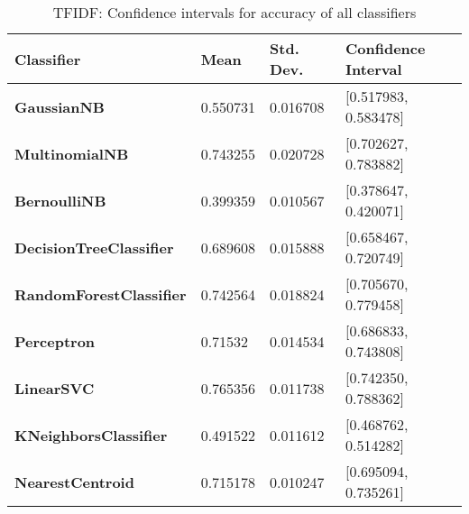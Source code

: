\documentclass{article}
\begin{document}
\begin{table}[H]
\begin{tabular}{l|lll}
\textbf{Classifier}             & \textbf{Mean} & \textbf{Std. Dev.} & \textbf{Confidence Interval} \\ \hline
\textbf{GaussianNB}             & 0.550731      & 0.016708                    & {[}0.517983, 0.583478{]}     \\
\textbf{MultinomialNB}          & 0.743255      & 0.020728                    & {[}0.702627, 0.783882{]}     \\
\textbf{BernoulliNB}            & 0.399359      & 0.010567                    & {[}0.378647, 0.420071{]}     \\
\textbf{DecisionTreeClassifier} & 0.689608      & 0.015888                    & {[}0.658467, 0.720749{]}     \\
\textbf{RandomForestClassifier} & 0.742564      & 0.018824                    & {[}0.705670, 0.779458{]}     \\
\textbf{Perceptron}             & 0.71532       & 0.014534                    & {[}0.686833, 0.743808{]}     \\
\textbf{LinearSVC}              & 0.765356      & 0.011738                    & {[}0.742350, 0.788362{]}     \\
\textbf{KNeighborsClassifier}   & 0.491522      & 0.011612                    & {[}0.468762, 0.514282{]}     \\
\textbf{NearestCentroid}        & 0.715178      & 0.010247                    & {[}0.695094, 0.735261{]}    
\end{tabular}
\caption {TFIDF: Confidence intervals for accuracy of all classifiers}
\end{table}
\end{document}
